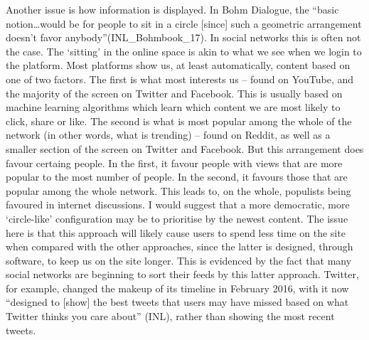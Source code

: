 \documentclass[]{article}
\begin{document}
Another issue is how information is displayed. In Bohm Dialogue, the
``basic notion\ldots{}would be for people to sit in a circle {[}since{]}
such a geometric arrangement doesn't favor anybody''(INL\_Bohmbook\_17).
In social networks this is often not the case. The `sitting' in the
online space is akin to what we see when we login to the platform. Most
platforms show us, at least automatically, content based on one of two
factors. The first is what most interests us -- found on YouTube, and
the majority of the screen on Twitter and Facebook. This is usually
based on machine learning algorithms which learn which content we are
most likely to click, share or like. The second is what is most popular
among the whole of the network (in other words, what is trending) --
found on Reddit, as well as a smaller section of the screen on Twitter
and Facebook. But this arrangement does favour certaing people. In the
first, it favour people with views that are more popular to the most
number of people. In the second, it favours those that are popular among
the whole network. This leads to, on the whole, populists being favoured
in internet discussions. I would suggest that a more democratic, more
`circle-like' configuration may be to prioritise by the newest content.
The issue here is that this approach will likely cause users to spend
less time on the site when compared with the other approaches, since the
latter is designed, through software, to keep us on the site longer.
This is evidenced by the fact that many social networks are beginning to
sort their feeds by this latter approach. Twitter, for example, changed
the makeup of its timeline in February 2016, with it now ``designed to
{[}show{]} the best tweets that users may have missed based on what
Twitter thinks you care about'' (INL), rather than showing the most
recent tweets.
\end{document}
